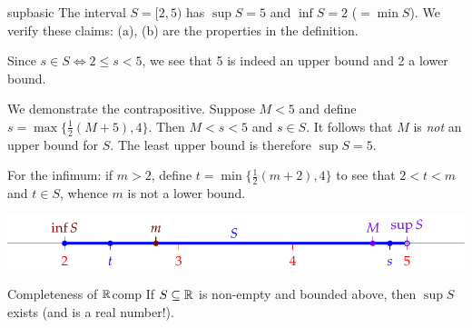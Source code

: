 \begin{example}{}{supbasic}
	The interval $S=[2,5)$ has $\sup S=5$ and $\inf S=2$ ($=\min S$). We verify these claims: (a), (b) are the properties in the definition.
	  \begin{enumeratea}
			\item Since $s\in S\iff 2\le s<5$, we see that 5 is indeed an upper bound and 2 a lower bound.
			\item We demonstrate the contrapositive. Suppose $M<5$ and define\footnotemark{} $s=\max\{\frac 12(M+5),4\}$. Then $M<s<5$ and $s\in S$. It follows that $M$ is \emph{not} an upper bound for $S$. The least upper bound is therefore $\sup S=5$.\par
			For the infimum: if $m>2$, define $t=\min\{\frac 12(m+2),4\}$ to see that $2<t<m$ and $t\in S$, whence $m$ is not a lower bound.
		\end{enumeratea}
	
		\begin{center}
			\vspace{-5pt}
			\includegraphics{supinf3}
		\end{center}

\end{example}



\begin{axiom}{Completeness of $\mathbb{R}$}{comp}
	If $S\subseteq\mathbb{R}$ is non-empty and bounded above, then $\sup S$ exists (and is a real number!).
\end{axiom}

